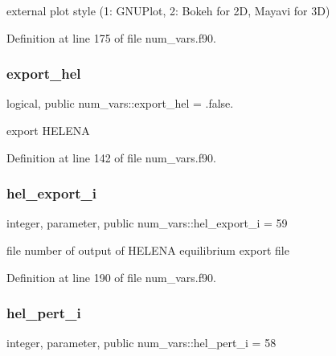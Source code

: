 external plot style (1\+: G\+N\+U\+Plot, 2\+: Bokeh for 2D, Mayavi for 3D) 



Definition at line 175 of file num\+\_\+vars.\+f90.

\mbox{\label{namespacenum__vars_aa1342b6b43268bd10bb254fa9bf754f0}} 
\subsubsection{\texorpdfstring{export\+\_\+hel}{export\_hel}}
{\footnotesize\ttfamily logical, public num\+\_\+vars\+::export\+\_\+hel = .false.}



export H\+E\+L\+E\+NA 



Definition at line 142 of file num\+\_\+vars.\+f90.

\mbox{\label{namespacenum__vars_ac781aa60ad67117abaff9737745e53f1}} 
\subsubsection{\texorpdfstring{hel\+\_\+export\+\_\+i}{hel\_export\_i}}
{\footnotesize\ttfamily integer, parameter, public num\+\_\+vars\+::hel\+\_\+export\+\_\+i = 59}



file number of output of H\+E\+L\+E\+NA equilibrium export file 



Definition at line 190 of file num\+\_\+vars.\+f90.

\mbox{\label{namespacenum__vars_a85c70cc05010c9efdf37551d9ec852cb}} 
\subsubsection{\texorpdfstring{hel\+\_\+pert\+\_\+i}{hel\_pert\_i}}
{\footnotesize\ttfamily integer, parameter, public num\+\_\+vars\+::hel\+\_\+pert\+\_\+i = 58}




